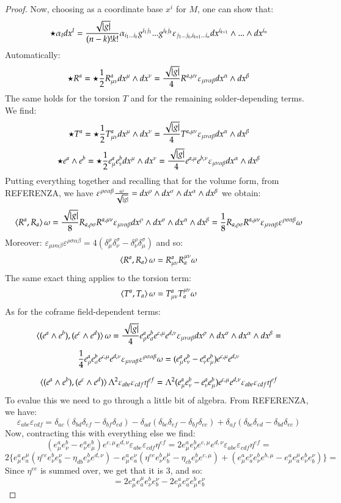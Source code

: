 \documentclass[12pt,a4paper]{report}
\theoremstyle{definition}
\theoremstyle{Theorem}
\theoremstyle{break}
\theoremstyle{definition}
\begin{document}
\begin{proof}
		Now, choosing as a coordinate base ${x^i}$ for $M$, one can show that:
		$$\star \alpha_Idx^I={\sqrt{|g|}\over (n-k)!k!}\alpha_{i_1...i_k}g^{i_1j_1}...g^{i_kj_k}\varepsilon_{j_1...j_k,i_{k+1}...i_n}dx^{i_{k+1}}\wedge...\wedge dx^{i_n}$$
		Automatically:
		$$\star R^a=\star{1\over 2} R^a_{\mu\nu}dx^\mu\wedge dx^\nu={\sqrt{|g|}\over 4}R^{a,\mu\nu}\varepsilon_{\mu\nu\alpha\beta}dx^\alpha\wedge dx^\beta$$
		The same holds for the torsion $T$ and for the remaining solder-depending terms. We find:
		$$\star T^a=\star{1\over 2} T^a_{\mu\nu}dx^\mu\wedge dx^\nu={\sqrt{|g|}\over 4}T^{a,\mu\nu}\varepsilon_{\mu\nu\alpha\beta}dx^\alpha\wedge dx^\beta$$
		$$\star e^a\wedge e^b=\star{1\over 2} e^a_{\mu} e^b_{\nu}dx^\mu\wedge dx^\nu={\sqrt{|g|}\over 4}e^{a,\mu} e^{b,\nu}\varepsilon_{\mu\nu\alpha\beta}dx^\alpha\wedge dx^\beta$$
		Putting everything together and recalling that for the volume form, from REFERENZA, we have $\varepsilon^{\rho\sigma\alpha\beta}{\omega\over \sqrt{|g|}}=dx^\rho\wedge dx^\sigma \wedge dx^\alpha\wedge dx^\beta$ we obtain:
		$$\braket{R^a,R_a}\omega={\sqrt{|g|}\over8}R_{a,\rho\sigma}R^{a,\mu\nu}\varepsilon_{\mu\nu\alpha\beta}dx^\rho\wedge dx^\sigma \wedge dx^\alpha\wedge dx^\beta={1\over8}R_{a,\rho\sigma}R^{a,\mu\nu}\varepsilon_{\mu\nu\alpha\beta}\varepsilon^{\rho\sigma\alpha\beta}\omega$$
		Moreover: $\varepsilon_{\mu\nu\alpha\beta}\varepsilon^{\rho\sigma\alpha\beta}=4(\delta^\rho_\mu \delta^\sigma_\nu-\delta^\rho_\nu \delta^\sigma_\mu)$ and so:
		$$\braket{R^a,R_a}\omega=R^a_{\mu\nu}R_a^{\mu\nu}\omega$$
		The same exact thing applies to the torsion term:
		$$\braket{T^a,T_a}\omega=T^a_{\mu\nu}T_a^{\mu\nu}\omega$$
		As for the coframe field-dependent terms:
		$$\braket{(e^a\wedge e^b),(e^c\wedge e^d)}\omega={\sqrt{|g|}\over 4}e^a_\rho e^b_\sigma e^{c,\mu} e^{d,\nu}\varepsilon_{\mu\nu\alpha\beta}dx^\rho\wedge dx^\sigma \wedge  dx^\alpha\wedge dx^\beta=$$
		$${1\over 4}e^a_\rho e^b_\sigma e^{c,\mu} e^{d,\nu}\varepsilon_{\mu\nu\alpha\beta}\varepsilon^{\rho\sigma\alpha\beta}\omega=(e^a_\mu e^b_\nu-e^a_\nu e^b_\mu) e^{c,\mu} e^{d,\nu}$$
		
		$$\braket{(e^a\wedge e^b),(e^c\wedge e^d)}\Lambda^2\varepsilon_{abe}\varepsilon_{cdf}\eta^{ef}=\Lambda^2(e^a_\mu e^b_\nu-e^a_\nu e^b_\mu) e^{c,\mu} e^{d,\nu}\varepsilon_{abe}\varepsilon_{cdf}\eta^{ef}$$
		To evalue this we need to go through a little bit of algebra. From REFERENZA, we have:
		$$\varepsilon_{abe}\varepsilon_{cdf}=\delta_{ac}(\delta_{bd}\delta_{ef}-\delta_{bf}\delta_{ed})-\delta_{ad}(\delta_{bc}\delta_{ef}-\delta_{bf}\delta_{ec})+\delta_{af}(\delta_{bc}\delta_{ed}-\delta_{bd}\delta_{ec})$$
		Now, contracting this with everything else we find:
		$$(e^a_\mu e^b_\nu-e^a_\nu e^b_\mu) e^{c,\mu} e^{d,\nu}\varepsilon_{abe}\varepsilon_{cdf}\eta^{ef}=2e^a_\mu e^b_\nu e^{c,\mu} e^{d,\nu}\varepsilon_{abe}\varepsilon_{cdf}\eta^{ef}=$$
		$$2\bigg\{
			e^a_\mu e_a^{\mu}(\eta^{ee}e^b_\nu e_b^{\nu}-\eta_{db}e^b_\nu e^{d,\nu})-e^a_\mu e_a^{\nu}(\eta^{ee}e^b_\nu e_b^{\mu}-\eta_{cb}e^b_\nu e^{c,\mu})+(e^a_\mu e_a^\nu e^b_\nu e^{b,\mu}-e^a_\mu e_a^\mu e^b_\nu e_b^\nu) \bigg\}=$$
		Since $\eta^{ee}$ is summed over, we get that it is 3, and so:
		$$=2e^a_\mu e^\mu_ae_\nu^b e^\nu_b-2e^a_\mu e^\nu_ae_\mu^b e^\nu_b$$
	\end{proof}
\end{document}

